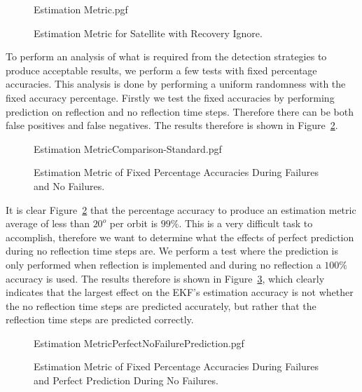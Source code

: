 \documentclass[letterpaper, 10 pt, conference]{ieeeconf}  %
\begin{document}
\begin{figure}[!htb]
	\begin{center}
		{Estimation Metric.pgf}
	\end{center}
	\caption[Estimation Metric for Satellite with Recovery Ignore]{Estimation Metric for Satellite with Recovery Ignore.}
	\label{fig:Estimation Accuracy EKF-ignore}
\end{figure}

To perform an analysis of what is required from the detection strategies to produce acceptable results, we perform a few tests with fixed percentage accuracies. This analysis is done by performing a uniform randomness with the fixed accuracy percentage. Firstly we test the fixed accuracies by performing prediction on reflection and no reflection time steps. Therefore there can be both false positives and false negatives. The results therefore is shown in Figure~\ref{fig:Estimation Accuracy EKF-ignore Comparison}.

\begin{figure}[!htb]
	\begin{center}
		{Estimation MetricComparison-Standard.pgf}
	\end{center}
	\caption[Estimation Metric of Fixed Percentage Accuracies During Failures and No Failures]{Estimation Metric of Fixed Percentage Accuracies During Failures and No Failures.}
	\label{fig:Estimation Accuracy EKF-ignore Comparison}
\end{figure}

It is clear Figure~\ref{fig:Estimation Accuracy EKF-ignore Comparison} that the percentage accuracy to produce an estimation metric average of less than $20^o$ per orbit is $99\%$. This is a very difficult task to accomplish, therefore we want to determine what the effects of perfect prediction during no reflection time steps are. We perform a test where the prediction is only performed when reflection is implemented and during no reflection a $100\%$ accuracy is used. The results therefore is shown in Figure~\ref{fig:Estimation Accuracy EKF-ignore Comparison PerfectNoFailure}, which clearly indicates that the largest effect on the EKF's estimation accuracy is not whether the no reflection time steps are predicted accurately, but rather that the reflection time steps are predicted correctly.

\begin{figure}[!htb]
	\begin{center}
		{Estimation MetricPerfectNoFailurePrediction.pgf}
	\end{center}
	\caption[Estimation Metric of Fixed Percentage Accuracies During Failures and Perfect Prediction During No Failures]{Estimation Metric of Fixed Percentage Accuracies During Failures and Perfect Prediction During No Failures.}
	\label{fig:Estimation Accuracy EKF-ignore Comparison PerfectNoFailure}
\end{figure}
\end{document}
